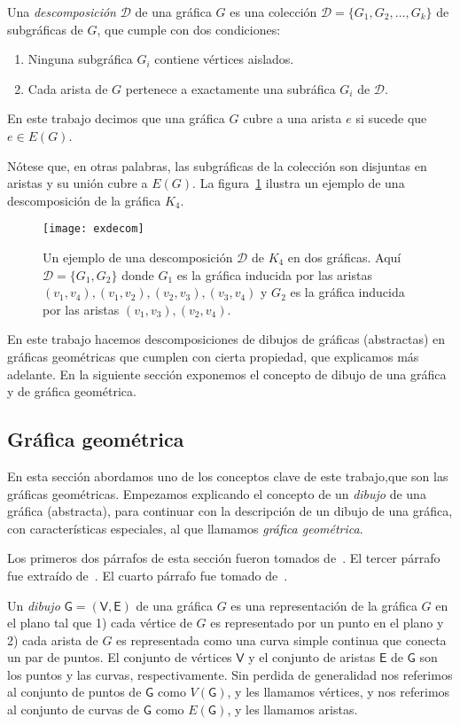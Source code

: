 Una \emph{descomposición} $\mathcal{D}$ de una gráfica $G$ es una colección
$\mathcal{D}=\{G_1,G_2,\dots,G_k\}$ de subgráficas de $G$, que cumple con dos
condiciones:
\begin{enumerate}
  \item Ninguna subgráfica $G_i$ contiene vértices aislados.
  \item Cada arista de $G$ pertenece a exactamente una subráfica $G_i$ de
  $\mathcal{D}$.
\end{enumerate}
En este trabajo decimos que una gráfica $G$ cubre a una arista $e$ si sucede
que $e\in E(G)$.

Nótese que, en otras palabras, las subgráficas de la colección son disjuntas en
aristas y su unión cubre a $E(G)$.
La figura~\ref{fig:exdecom} ilustra un ejemplo de una descomposición de la
gráfica $K_4$.
\begin{figure}[htbp]
  \centering
  \texttt{[image: exdecom]}
  \caption{Un ejemplo de una descomposición $\mathcal{D}$ de $K_4$ en dos
  gráficas. Aquí $\mathcal{D}=\{G_1,G_2\}$ donde $G_1$ es la gráfica inducida
  por las aristas $(v_1,v_4),(v_1,v_2),(v_2,v_3),(v_3,v_4)$ y
  $G_2$ es la gráfica inducida por las aristas $(v_1,v_3),(v_2,v_4)$.}
  \label{fig:exdecom}
\end{figure}
%
%

En este trabajo hacemos descomposiciones de dibujos de gráficas (abstractas) en
gráficas geométricas que cumplen con cierta propiedad, que explicamos más
adelante. En la siguiente sección exponemos el concepto de dibujo de una
gráfica y de gráfica geométrica.

\subsection{Gráfica geométrica}
En esta sección abordamos uno de los conceptos clave de este trabajo,que son
las gráficas geométricas. Empezamos explicando el concepto de un
\emph{dibujo} de una gráfica (abstracta), para continuar con la descripción
de un dibujo de una gráfica, con características especiales, al que llamamos
\emph{gráfica geométrica}.

Los primeros dos párrafos de esta sección fueron tomados de~\cite{Pach2013}. El
tercer párrafo fue extraído de~\cite{Lara2019}. El cuarto párrafo fue tomado
de~\cite{Pach2011}.

Un \emph{dibujo} $\mathsf{G}=(\mathsf{V},\mathsf{E})$ de una gráfica $G$ es una
representación de la gráfica $G$ en el plano tal que 1) cada vértice de $G$ es
representado por un punto en el plano y 2) cada arista de $G$ es representada
como una curva simple continua que conecta un par de puntos. El conjunto de
vértices $\mathsf{V}$ y el conjunto de aristas $\mathsf{E}$ de $\mathsf{G}$
son los puntos y las curvas, respectivamente. Sin perdida de generalidad nos
referimos al conjunto de puntos de $\mathsf{G}$ como $V(\mathsf{G})$, y les
llamamos vértices, y nos referimos al conjunto de curvas de $\mathsf{G}$ como
$E(\mathsf{G})$, y les llamamos aristas.

